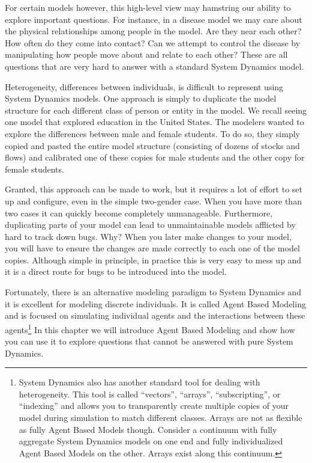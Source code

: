 \documentclass[]{memoir}
\begin{document}
For certain models however, this high-level view may hamstring our
ability to explore important questions. For instance, in a disease model
we may care about the physical relationships among people in the model.
Are they near each other? How often do they come into contact? Can we
attempt to control the disease by manipulating how people move about and
relate to each other? These are all questions that are very hard to
answer with a standard System Dynamics model.

Heterogeneity, differences between individuals, is difficult to
represent using System Dynamics models. One approach is simply to
duplicate the model structure for each different class of person or
entity in the model. We recall seeing one model that explored education
in the United States. The modelers wanted to explore the differences
between male and female students. To do so, they simply copied and
pasted the entire model structure (consisting of dozens of stocks and
flows) and calibrated one of these copies for male students and the
other copy for female students.

Granted, this approach can be made to work, but it requires a lot of
effort to set up and configure, even in the simple two-gender case. When
you have more than two cases it can quickly become completely
unmanageable. Furthermore, duplicating parts of your model can lead to
unmaintainable models afflicted by hard to track down bugs. Why? When
you later make changes to your model, you will have to ensure the
changes are made correctly to each one of the model copies. Although
simple in principle, in practice this is very easy to mess up and it is
a direct route for bugs to be introduced into the model.

Fortunately, there is an alternative modeling paradigm to System
Dynamics and it is excellent for modeling discrete individuals. It is
called Agent Based Modeling and is focused on simulating individual
agents and the interactions between these agents\footnote{System
  Dynamics also has another standard tool for dealing with
  heterogeneity. This tool is called ``vectors'', ``arrays'',
  ``subscripting'', or ``indexing'' and allows you to transparently
  create multiple copies of your model during simulation to match
  different classes. Arrays are not as flexible as fully Agent Based
  Models though. Consider a continuum with fully aggregate System
  Dynamics models on one end and fully individualized Agent Based Models
  on the other. Arrays exist along this continuum.} In this chapter we
will introduce Agent Based Modeling and show how you can use it to
explore questions that cannot be answered with pure System Dynamics.
\end{document}
